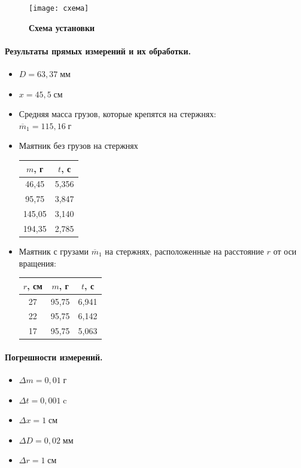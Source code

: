 \documentclass{article}
\begin{document}
\begin{figure}[htb]
	\caption{\bf Схема установки}
	\centering \texttt{[image: схема]}
\end{figure}


\paragraph{Результаты прямых измерений и их обработки.}
\begin{itemize}
	\item $ D=63,37\;\mbox{мм} $
	\item $ x=45,5\;\mbox{см} $
	\item Средняя масса грузов, которые крепятся на стержнях:\\
	$ \overline{m}_1 = 115,16\;\mbox{г}$
	\item Маятник без грузов на стержнях
	
	\begin{tabular}{c|c}
		
		$m$, г& $t$, с \\
		\hline
		46,45& 5,356 \\
		
		95,75& 3,847 \\
		
		145,05& 3,140 \\
		
		194,35& 2,785 \\
	\end{tabular}
\item Маятник с грузами $\overline{m}_1$ на стержнях, расположенные на расстояние $r$ от оси вращения:

\begin{tabular}{c|c|c}

	$r$, см&$m$, г& $t$, с \\
	\hline
	27&95,75  &6,941  \\
	22&95,75  &6,142  \\
	17&95,75  &5,063  \\
	
\end{tabular}


\end{itemize}

\paragraph{Погрешности измерений.}
\begin{itemize}
	\item $\Delta m = 0,01\;\mbox{г}$
	\item $\Delta t = 0,001\;\mbox{c}$
	\item $\Delta x = 1\;\mbox{см}$
	\item $\Delta D = 0,02\;\mbox{мм}$
	\item $\Delta r = 1\;\mbox{см}$
\end{itemize}
\end{document}
